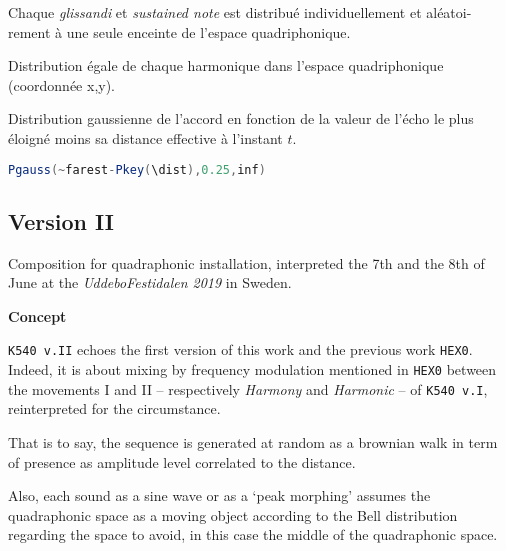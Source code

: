 \begin{description}[itemsep=10pt]
\item[Mvt \texttt{[1]}]
\hfill

Chaque \textit{glissandi} et \textit{sustained note} est distribu\'e individuellement et al\'eatoi- rement \`a une seule enceinte de l'espace quadriphonique.
\item[Mvt \texttt{[2]}]
\hfill

Distribution \'egale de chaque harmonique dans l'espace quadriphonique (coordonn\'ee x,y).

\item[Mvt \texttt{[3]}]
\hfill

Distribution gaussienne de l'accord en fonction de la valeur de l'\'echo le plus \'eloign\'e moins sa distance effective \`a l'instant $t$.
  \begin{lstlisting}[basicstyle=\footnotesize\ttfamily,language=Java]
 Pgauss(~farest-Pkey(\dist),0.25,inf)
\end{lstlisting}
\end{description}

\subsection[\texttt{v.II}]{Version II}
\label{k540v2}

\smallskip

Composition for quadraphonic installation, interpreted the 7th and the 8th of June at the \textit{UddeboFestidalen 2019} in Sweden.

\bigskip

\noindent \textbf{{\large Concept}}
\hrulefill

\bigskip

\texttt{K540 v.II} echoes the first version of this work and the previous work \texttt{HEX0}. Indeed, it is about mixing by frequency modulation mentioned in \texttt{HEX0} between the movements I and II -- respectively \textsl{Harmony} and \textsl{Harmonic} -- of  \texttt{K540 v.I}, reinterpreted for the circumstance. 

That is to say, the sequence is generated at random as a brownian walk in term of presence as amplitude level correlated to the distance.

Also, each sound as a sine wave or as a `peak morphing'  assumes the quadraphonic space as a moving object according to the Bell distribution regarding the space to avoid, in this case the middle of the quadraphonic space.

